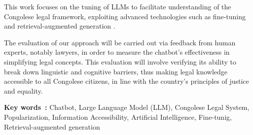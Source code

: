 This work focuses on the tuning of LLMs to facilitate understanding of the Congolese legal framework, exploiting advanced technologies such as fine-tuning and retrieval-augmented generation \cite{lewis2021retrievalaugmented}. 

The evaluation of our approach will be carried out via feedback from human experts, notably lawyers, in order to measure the chatbot's effectiveness in simplifying legal concepts. This evaluation will involve verifying its ability to break down linguistic and cognitive barriers, thus making legal knowledge accessible to all Congolese citizens, in line with the country's principles of justice and equality.

\vspace{1cm}
\textbf{Key words~:} Chatbot, Large Language Model (LLM), Congolese Legal System, Popularization, Information Accessibility, Artificial Intelligence, Fine-tunig, Retrieval-augmented generation


\endgroup			

\vfill
